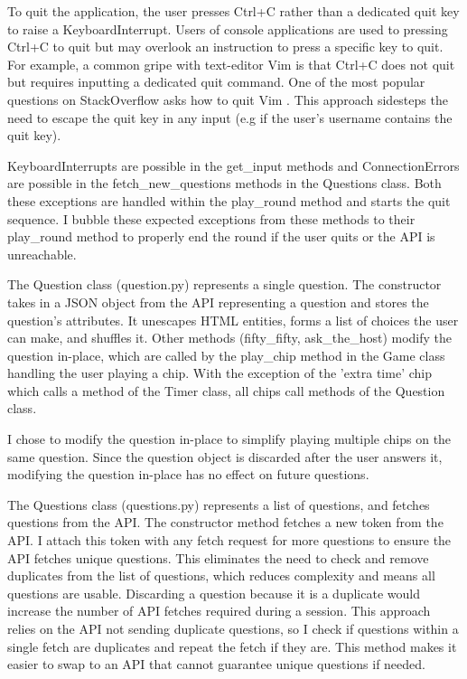 \documentclass[12pt]{article}
\begin{document}
To quit the application, the user presses Ctrl+C rather than a dedicated quit key to raise a KeyboardInterrupt. Users of console applications are used to pressing Ctrl+C to quit but may overlook an instruction to press a specific key to quit. For example, a common gripe with text-editor Vim is that Ctrl+C does not quit but requires inputting a dedicated quit command. One of the most popular questions on StackOverflow asks how to quit Vim \cite{web:1}. This approach sidesteps the need to escape the quit key in any input (e.g if the user's username contains the quit key). 

KeyboardInterrupts are possible in the get\_input methods and ConnectionErrors are possible in the fetch\_new\_questions methods in the Questions class. Both these exceptions are handled within the play\_round method and starts the quit sequence. I bubble these expected exceptions from these methods to their play\_round method to properly end the round if the user quits or the API is unreachable. 

\vspace{\baselineskip}

The Question class (question.py) represents a single question. The constructor takes in a JSON object from the API representing a question and stores the question's attributes. It unescapes HTML entities, forms a list of choices the user can make, and shuffles it. Other methods (fifty\_fifty, ask\_the\_host) modify the question in-place, which are called by the play\_chip method in the Game class handling the user playing a chip. With the exception of the 'extra time' chip which calls a method of the Timer class, all chips call methods of the Question class.

I chose to modify the question in-place to simplify playing multiple chips on the same question. Since the question object is discarded after the user answers it, modifying the question in-place has no effect on future questions.

\vspace{\baselineskip}

The Questions class (questions.py) represents a list of questions, and fetches questions from the API. The constructor method fetches a new token from the API. I attach this token with any fetch request for more questions to ensure the API fetches unique questions. This eliminates the need to check and remove duplicates from the list of questions, which reduces complexity and means all questions are usable. Discarding a question because it is a duplicate would increase the number of API fetches required during a session. This approach relies on the API not sending duplicate questions, so I check if questions within a single fetch are duplicates and repeat the fetch if they are. This method makes it easier to swap to an API that cannot guarantee unique questions if needed. 
\end{document}
